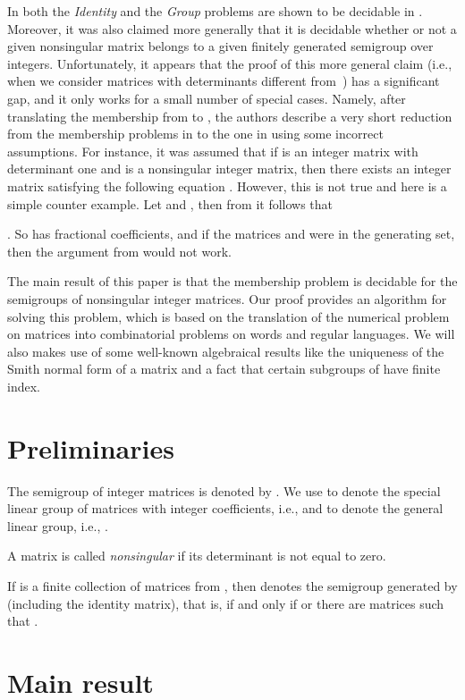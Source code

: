 \documentclass[fontsize=11pt,DIV=13,paper=letter]{scrartcl}
\theoremstyle{definition}
\begin{document}
In \cite{CK2005} both the {\sl Identity} and the {\sl Group} problems are shown to be decidable in  . 
Moreover, it was also claimed more generally
that it is decidable whether or not a given nonsingular matrix belongs to a given finitely generated semigroup over integers.
Unfortunately, it appears that the proof of this more general claim (i.e., when we consider matrices with determinants different from~) has a significant gap,
and it only works for a small number of special cases. Namely, after translating the membership from  to , the authors describe a very short reduction 
from the membership problems in  to the one in  using some incorrect assumptions.
For instance, it was assumed that if  is an integer matrix with determinant one and  is a nonsingular integer matrix, then 
there exists an integer matrix  satisfying the following equation  . However, this is not true and here is a simple counter example.
Let  and , then from  it follows that 

. So  has fractional coefficients, and if the matrices  and  were in the generating set, then the argument from \cite{CK2005} would not work.

The main result of this paper is that the membership problem is decidable
for the semigroups of  nonsingular integer matrices. Our proof provides an algorithm for solving this problem, which is
based on the translation of the numerical problem on matrices into combinatorial problems on words and regular languages. We will also makes use of some well-known algebraical results like the uniqueness of the Smith normal form of a matrix and a fact that certain subgroups of  have finite index.


\section{Preliminaries}

The semigroup of  integer matrices is denoted by .
We use  to denote the special linear group of  matrices with integer coefficients, i.e.,  and  to denote the general linear group, i.e., .

A matrix is called \emph{nonsingular} if its determinant is not equal to zero.

If  is a finite collection of matrices from , then  denotes the semigroup generated by  (including the identity matrix), that is,  if and only if  or there are matrices  such that .

\section{Main result}
\end{document}
